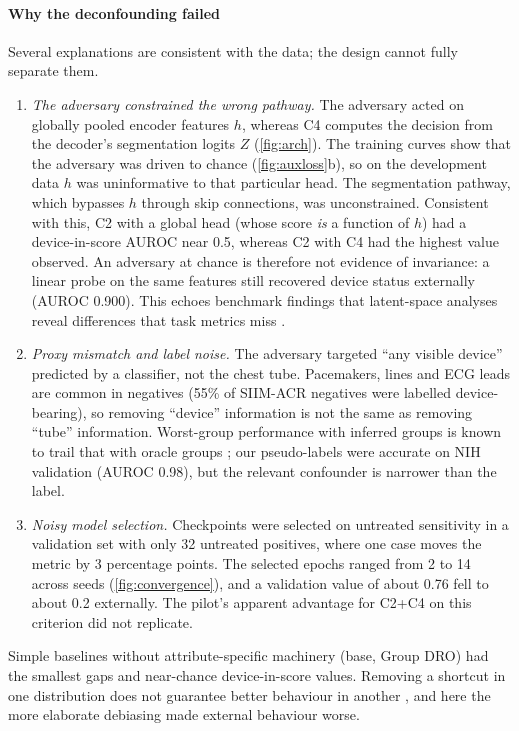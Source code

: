 \documentclass[final,3p]{elsarticle}
\begin{document}
\paragraph{Why the deconfounding failed}
Several explanations are consistent with the data; the design cannot fully separate them.
\begin{enumerate}
  \item \emph{The adversary constrained the wrong pathway.} The adversary acted on globally pooled encoder features $h$, whereas C4 computes the decision from the decoder's segmentation logits $Z$ (\cref{fig:arch}). The training curves show that the adversary was driven to chance (\cref{fig:auxloss}b), so on the development data $h$ was uninformative to that particular head. The segmentation pathway, which bypasses $h$ through skip connections, was unconstrained. Consistent with this, C2 with a global head (whose score \emph{is} a function of $h$) had a device-in-score AUROC near 0.5, whereas C2 with C4 had the highest value observed. An adversary at chance is therefore not evidence of invariance: a linear probe on the same features still recovered device status externally (AUROC 0.900). This echoes benchmark findings that latent-space analyses reveal differences that task metrics miss \citep{muller2026disentangle}.
  \item \emph{Proxy mismatch and label noise.} The adversary targeted ``any visible device'' predicted by a classifier, not the chest tube. Pacemakers, lines and ECG leads are common in negatives (55\% of SIIM-ACR negatives were labelled device-bearing), so removing ``device'' information is not the same as removing ``tube'' information. Worst-group performance with inferred groups is known to trail that with oracle groups \citep{han2024gic,liu2021jtt}; our pseudo-labels were accurate on NIH validation (AUROC 0.98), but the relevant confounder is narrower than the label.
  \item \emph{Noisy model selection.} Checkpoints were selected on untreated sensitivity in a validation set with only 32 untreated positives, where one case moves the metric by 3 percentage points. The selected epochs ranged from 2 to 14 across seeds (\cref{fig:convergence}), and a validation value of about 0.76 fell to about 0.2 externally. The pilot's apparent advantage for C2+C4 on this criterion did not replicate.
\end{enumerate}
Simple baselines without attribute-specific machinery (base, Group DRO) had the smallest gaps and near-chance device-in-score values. Removing a shortcut in one distribution does not guarantee better behaviour in another \citep{yang2024limits}, and here the more elaborate debiasing made external behaviour worse.
\end{document}
